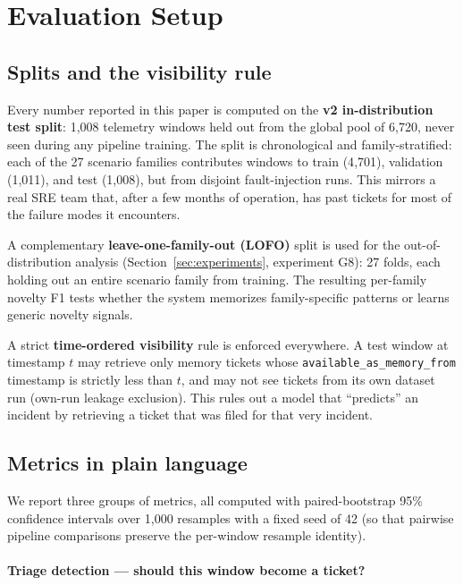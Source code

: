\section{Evaluation Setup}
\label{sec:eval-setup}

\subsection{Splits and the visibility rule}

Every number reported in this paper is computed on the \textbf{v2 in-distribution test split}: 1{,}008 telemetry windows held out from the global pool of 6{,}720, never seen during any pipeline training. The split is chronological and family-stratified: each of the 27 scenario families contributes windows to train (4{,}701), validation (1{,}011), and test (1{,}008), but from disjoint fault-injection runs. This mirrors a real SRE team that, after a few months of operation, has past tickets for most of the failure modes it encounters.

A complementary \textbf{leave-one-family-out (LOFO)} split is used for the out-of-distribution analysis (Section~\ref{sec:experiments}, experiment G8): 27 folds, each holding out an entire scenario family from training. The resulting per-family novelty F1 tests whether the system memorizes family-specific patterns or learns generic novelty signals.

A strict \textbf{time-ordered visibility} rule is enforced everywhere. A test window at timestamp $t$ may retrieve only memory tickets whose \texttt{available\_as\_memory\_from} timestamp is strictly less than $t$, and may not see tickets from its own dataset run (own-run leakage exclusion). This rules out a model that ``predicts'' an incident by retrieving a ticket that was filed for that very incident.

\subsection{Metrics in plain language}

We report three groups of metrics, all computed with paired-bootstrap 95\% confidence intervals over 1{,}000 resamples with a fixed seed of 42 (so that pairwise pipeline comparisons preserve the per-window resample identity).

\paragraph{Triage detection --- should this window become a ticket?}

